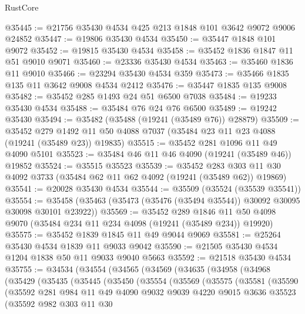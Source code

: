 \begin{lexlean}{RustCore}
\begin{coremodule}
@35445 := @21756 @35430 @4534 @425 @213 @1848 @101 @3642 @9072 @9006 @24852
@35447 := @19806 @35430 @4534
@35450 := @35447 @1848 @101 @9072
@35452 := @19815 @35430 @4534
@35458 := @35452 @1836 @1847 @11 @51 @9010 @9071
@35460 := @23336 @35430 @4534
@35463 := @35460 @1836 @11 @9010
@35466 := @23294 @35430 @4534 @359
@35473 := @35466 @1835 @135 @11 @3642 @9008 @4534 @2412
@35476 := @35447 @1835 @135 @9008
@35482 := @35452 @285 @1493 @24 @51 @6500 @7038
@35484 := @19233 @35430 @4534
@35488 := @35484 @76 @24 @76 @6500
@35489 := @19242 @35430
@35494 := @35482 (@35488 (@19241 (@35489 @76)) @28879)
@35509 := @35452
    @279
    @1492
    @11
    @50
    @4088
    @7037
    (@35484 @23 @11 @23 @4088 (@19241 (@35489 @23)) @19835)
@35515 := @35452 @281 @1096 @11 @49 @4090 @5101
@35523 := @35484 @46 @11 @46 @4090 (@19241 (@35489 @46)) @19852
@35524 := @35515 @35523
@35539 := @35452
    @283
    @303
    @11
    @30
    @4092
    @3733
    (@35484 @62 @11 @62 @4092 (@19241 (@35489 @62)) @19869)
@35541 := @20028 @35430 @4534
@35544 := @35509 (@35524 (@35539 @35541))
@35554 := @35458 (@35463 (@35473 (@35476 (@35494 @35544)) @30092 @30095 @30098 @30101 @23922))
@35569 := @35452
    @289
    @1846
    @11
    @50
    @4098
    @9070
    (@35484 @234 @11 @234 @4098 (@19241 (@35489 @234)) @19920)
@35575 := @35452 @1839 @1845 @11 @49 @9044 @9069
@35581 := @25264 @35430 @4534 @1839 @11 @9033 @9042
@35590 := @21505 @35430 @4534 @1204 @1838 @50 @11 @9033 @9040 @5663
@35592 := @21518 @35430 @4534
@35755 := @34534
    (@34554
      (@34565
        (@34569
          (@34635
            (@34958
              (@34968
                (@35429
                  (@35435
                    (@35445
                      (@35450
                        (@35554
                          (@35569
                            (@35575
                              (@35581
                                (@35590
                                  (@35592
                                    @281
                                    @984
                                    @11
                                    @49
                                    @4090
                                    @9032
                                    @9039
                                    @4220
                                    @9015
                                    @3636
                                    @35523
                                    (@35592
                                      @982
                                      @303
                                      @11
                                      @30

\end{coremodule}
\end{lexlean}
